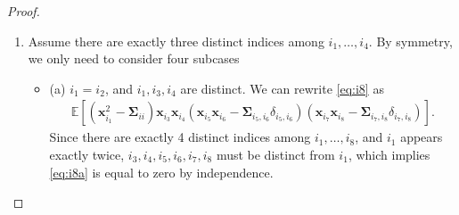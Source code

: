 \documentclass[10pt,a4paper]{amsart}
\newcommand{\E}{\mathbb{E}}
\def\bA{{\boldsymbol A}}
\def\bSigma{{\boldsymbol \Sigma}}
\def\bx{{\boldsymbol x}}
\def\msf{\mathsf}
\begin{document}
\begin{proof}
\begin{enumerate}
\begin{align}
        C \left(\sum_{i_1< i_2,i_3< i_4} |\bA_{i_1i_2,i_3i_4}|^2\right)=C\|\bA\|_{\msf F}^2\leq C d^2 \|\bA\|^2 =O(d^2).
    \end{align}
    \item Assume there are exactly three distinct indices among $i_1,\dots, i_4$.  By symmetry, we only need to consider four subcases 
    \begin{itemize}
        \item (a) $i_1=i_2$, and $i_1,i_3,i_4$ are distinct. We can rewrite \eqref{eq:i8} as 
        \begin{align}\label{eq:i8a}
            \E[(\bx_{i_1}^2-\bSigma_{ii})\bx_{i_3}\bx_{i_4}(\bx_{i_5}\bx_{i_6}-\bSigma_{i_5,i_6}\delta_{i_5,i_6})(\bx_{i_7}\bx_{i_8}-\bSigma_{i_7,i_8}\delta_{i_7,i_8})].
        \end{align}
      Since there are exactly 4 distinct indices among $i_1,\dots,i_8$, and $i_1$ appears exactly twice,  $i_3,i_4,i_5,i_6,i_7,i_8$ must be distinct from $i_1$, which implies \eqref{eq:i8a} is equal to zero by independence.
    
      


\end{itemize}
\end{enumerate}
\end{proof}
\end{document}
